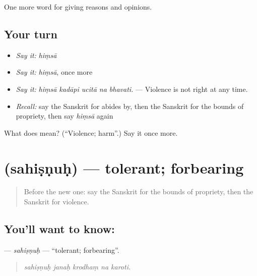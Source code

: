 \begin{grammarlens}[title={What you've built}]
One more word for giving reasons and opinions.
\end{grammarlens}

\subsection*{Your turn}
\begin{itemize}
\raggedright
  \item \emph{Say it:} \emph{hiṃsā}
  \item \emph{Say it:} \emph{hiṃsā}, once more
  \item \emph{Say it:} \emph{hiṃsā kadāpi ucitā na bhavati.} — Violence is not right at any time.
  \item \emph{Recall:} say the Sanskrit for abides by, then the Sanskrit for the bounds of propriety, then say \emph{hiṃsā} again
\end{itemize}

\begin{tcolorbox}[breakable,colback=teal!4,colframe=teal!35!black,title={Before you move on}]
What does  mean? (\textquotedblleft{}Violence; harm\textquotedblright{}.) Say it once more.
\end{tcolorbox}
\section[\texorpdfstring{\sk{सहिष्णुः} (sahiṣṇuḥ)}{सहिष्णुः (sahiṣṇuḥ)}]{ (sahiṣṇuḥ) — tolerant; forbearing}

\label{lesson:SA-C352-sahisnuh}



\begin{quote}
Before the new one: say the Sanskrit for the bounds of propriety, then the Sanskrit for violence.
\end{quote}

\subsection*{You'll want to know: }
\textbf{} — \emph{sahiṣṇuḥ} — \textquotedblleft{}tolerant; forbearing\textquotedblright{}.

\begin{quote}
    
\end{quote}

\begin{quote}
\emph{sahiṣṇuḥ janaḥ krodhaṃ na karoti.}
\end{quote}

